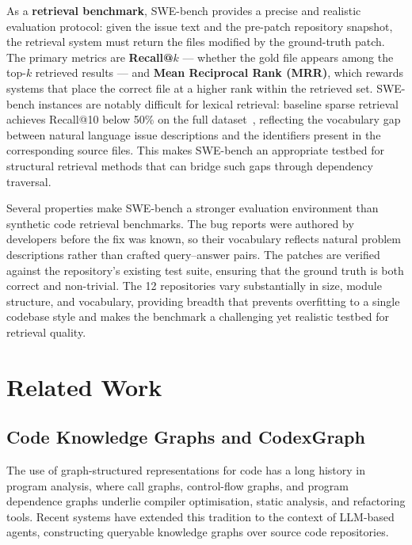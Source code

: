 As a \textbf{retrieval benchmark}, SWE-bench provides a precise and realistic evaluation
protocol: given the issue text and the pre-patch repository snapshot, the retrieval system
must return the files modified by the ground-truth patch.
The primary metrics are \textbf{Recall@$k$} — whether the gold file appears among the
top-$k$ retrieved results — and \textbf{Mean Reciprocal Rank (MRR)}, which rewards
systems that place the correct file at a higher rank within the retrieved set.
SWE-bench instances are notably difficult for lexical retrieval: baseline sparse
retrieval achieves Recall@10 below 50\% on the full dataset~\cite{yang2024swebench},
reflecting the vocabulary gap between natural language issue descriptions and the
identifiers present in the corresponding source files.
This makes SWE-bench an appropriate testbed for structural retrieval methods that can
bridge such gaps through dependency traversal.

Several properties make SWE-bench a stronger evaluation environment than synthetic code
retrieval benchmarks.
The bug reports were authored by developers before the fix was known, so their vocabulary
reflects natural problem descriptions rather than crafted query--answer pairs.
The patches are verified against the repository's existing test suite, ensuring that the
ground truth is both correct and non-trivial.
The 12 repositories vary substantially in size, module structure, and vocabulary,
providing breadth that prevents overfitting to a single codebase style and makes the
benchmark a challenging yet realistic testbed for retrieval quality.

\section{Related Work}
\label{sec:related-work}

\subsection{Code Knowledge Graphs and CodexGraph}
\label{sec:codexgraph}

The use of graph-structured representations for code has a long history in program
analysis, where call graphs, control-flow graphs, and program dependence graphs underlie
compiler optimisation, static analysis, and refactoring tools.
Recent systems have extended this tradition to the context of LLM-based agents,
constructing queryable knowledge graphs over source code repositories.

